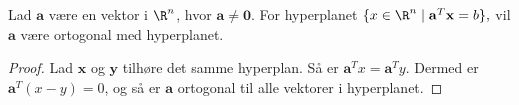 \\\\
%
%
%
\begin{thm}{}{}
Lad $\mathbf{a}$ være en vektor i $\R^n$, hvor 
$\mathbf{a} \neq \mathbf{0}.$
For hyperplanet 
$\{x \in \R^n \mid \mathbf{a}^T \mathbf{x}=b\},$ 
vil $\mathbf{a}$ være ortogonal med hyperplanet.
\end{thm}
% 
\begin{proof}
Lad $\mathbf{x}$ og $\mathbf{y}$ tilhøre det samme hyperplan. 
Så er $\mathbf{a}^Tx=\mathbf{a}^Ty.$
Dermed er $\mathbf{a}^T(x-y)=0$, og så er $\mathbf{a}$ ortogonal til alle vektorer i hyperplanet. 
\end{proof}